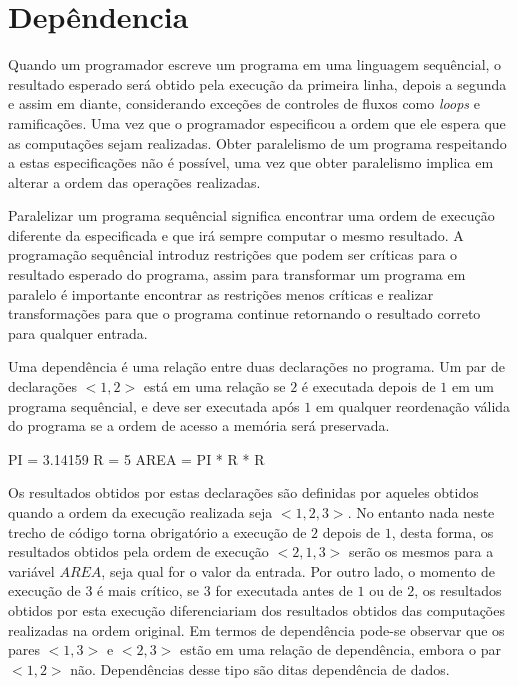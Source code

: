 
\chapter{Depêndencia}

Quando um programador escreve um programa em uma linguagem sequêncial, o
resultado esperado será obtido pela execução da primeira linha, depois a segunda
e assim em diante, considerando exceções de controles de fluxos como
\textit{loops} e ramificações. 
Uma vez que o programador especificou a ordem que ele espera que as computações 
sejam realizadas. 
Obter paralelismo de um programa respeitando a estas especificações não é
possível, uma vez que obter paralelismo implica em alterar a ordem das
operações realizadas.

Paralelizar um programa sequêncial significa encontrar uma ordem de execução
diferente da especificada e que irá sempre computar o mesmo resultado.
A programação sequêncial introduz restrições que podem ser críticas para o
resultado esperado do programa, assim para transformar um programa em paralelo é
importante encontrar as restrições menos críticas e realizar transformações para
que o programa continue retornando o resultado correto para qualquer entrada.


Uma dependência é uma relação entre duas declarações no programa. 
Um par de declarações $<1,2>$ está em uma relação se $2$ é executada 
depois de $1$ em um programa sequêncial, e deve ser executada após $1$ 
em qualquer reordenação válida do programa se a ordem de acesso a 
memória será preservada.

\begin{algorithm}
        \begin{algorithmic}[1]
                \STATE PI = 3.14159
                \STATE R = 5
                \STATE AREA = PI * R * R
\end{algorithmic}
\end{algorithm}


Os resultados obtidos por estas declarações são definidas por aqueles obtidos
quando a ordem da execução realizada seja $<1,2,3>$. 
No entanto nada neste trecho de código torna obrigatório a execução de 
$2$ depois de $1$, desta forma, os resultados obtidos pela ordem de execução 
$<2,1,3>$ serão os mesmos para a variável $AREA$, seja qual for o valor 
da entrada.
Por outro lado, o momento de execução de $3$ é mais crítico, se $3$ for
executada antes de $1$ ou de $2$, os resultados obtidos por esta execução
diferenciariam dos resultados obtidos das computações realizadas na ordem
original.
Em termos de dependência pode-se observar que os pares $<1,3>$ e $<2,3>$
estão em uma relação de dependência, embora o par $<1,2>$ não.
Dependências desse tipo são ditas dependência de dados.

